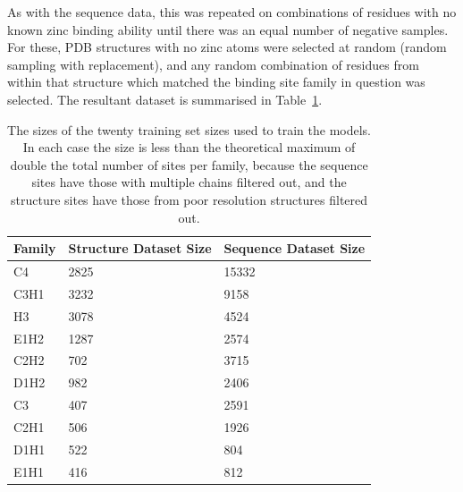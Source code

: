 As with the sequence data, this was repeated on combinations of residues with no known zinc binding ability until there was an equal number of negative samples. For these, PDB structures with no zinc atoms were selected at random (random sampling with replacement), and any random combination of residues from within that structure which matched the binding site family in question was selected. The resultant dataset is summarised in Table~\ref{tab:dataset-size}.

\begin{table}
  \caption[Training set size.]{\label{tab:dataset-size}The sizes of the twenty training set sizes used to train the models. In each case the size is less than the theoretical maximum of double the total number of sites per family, because the sequence sites have those with multiple chains filtered out, and the structure sites have those from poor resolution structures filtered out.}
\begin{center}
\begin{tabular}{lll} \hline
Family & Structure Dataset Size & Sequence Dataset Size \\ \hline
C4     & 2825         &  15332  \\
C3H1   & 3232         &  9158   \\
H3     & 3078         &  4524   \\
E1H2   & 1287         &  2574   \\
C2H2   &  702         &  3715   \\
D1H2   &  982         &  2406   \\
C3     &  407         &  2591   \\
C2H1   &  506         &  1926   \\
D1H1   &  522         &  804    \\ 
E1H1   &  416         &  812    \\ \hline
\end{tabular}
\end{center}
\end{table}

